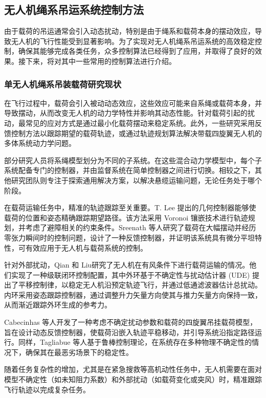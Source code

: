 \documentclass[lang=chs, degree=master, blindreview=false, winfonts=true]{yanputhesis}
\begin{document}
\subsection{无人机绳系吊运系统控制方法}
由于载荷的吊运通常会引入动态扰动，特别是由于绳系和载荷本身的摆动效应，导致无人机的飞行性能受到显著影响。为了实现对无人机绳系吊运系统的高效稳定控制，确保其能够完成各类任务，众多控制算法已经得到了应用，并取得了良好的效果。接下来，将对其中一些常用的控制算法进行介绍。
\subsubsection{单无人机绳系吊装载荷研究现状}
在飞行过程中，载荷会引入被动动态效应，这些效应可能来自系绳或载荷本身，并导致摆动，从而改变无人机的动力学特性并影响其动态性能。针对载荷引起的扰动，最常见的应对方式是通过最小化载荷摆动来稳定系统\cite{lv2022finite,2019An}。此外，一些研究采用反馈控制方法以跟踪期望的载荷轨迹，或通过轨迹规划算法解决带载四旋翼无人机的多体系统动力学问题\cite{2017Fast}。

部分研究人员将系绳模型划分为不同的子系统。在这些混合动力学模型中，每个子系统配备专门的控制器，并由监督系统在简单控制器之间进行切换\cite{sreenath2013trajectory,cruz2015lift}。相较之下，其他研究团队则专注于探索通用解决方案，以解决悬缆运输问题，无论任务处于哪个阶段\cite{guo2020multiple,villa2021cooperative}。

在载荷运输任务中，精准的轨迹跟踪至关重要。T. Lee 提出的几何控制器\cite{lee2015collision,lee2017geometric}能够使载荷的位置和姿态精确跟踪期望路径。该方法采用 Voronoi 镶嵌技术进行轨迹规划，并考虑了避障相关的约束条件。Sreenath 等人\cite{sreenath2013trajectory}研究了载荷在大幅摆动并经历零张力瞬间时的控制问题，设计了一种反馈控制器，并证明该系统具有微分平坦特性，可有效应用于无人机与载荷系统的控制。

针对外部扰动，Qian 和 Liu\cite{qian2019path}研究了无人机在有风条件下进行载荷运输的情况。他们实现了一种级联闭环控制配置，其中外环基于不确定性与扰动估计器 (UDE) 提出了平移控制律，以稳定无人机沿预定轨迹飞行，并通过低通滤波器估计总扰动。内环采用姿态跟踪控制器，通过调整升力矢量方向使其与推力矢量方向保持一致，从而渐近跟踪外环生成的参考力。

Cabecinhas 等人\cite{cabecinhas2019trajectory}开发了一种考虑不确定扰动参数和载荷的四旋翼吊挂载荷模型，旨在设计动态反馈控制器，使载荷沿嵌入轨迹平稳移动，并引导系统沿指定路径运行。同样，Tagliabue 等人\cite{2019Robust}基于鲁棒控制理论，在系统存在多种物理不确定性的情况下，确保其在最恶劣场景下的稳定性。

随着任务复杂性的增加，尤其是在紧急搜救等高机动性任务中，无人机需要在面对模型不确定性（如未知阻力系数）和外部扰动（如载荷变化或突风）时，精准跟踪飞行轨迹以完成复杂任务。
\end{document}
